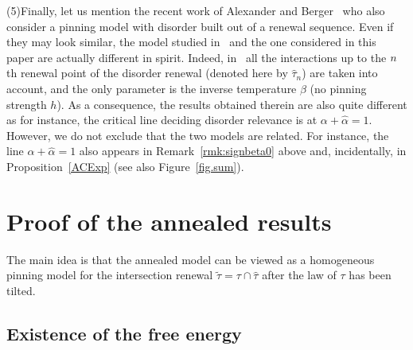 \documentclass[10pt]{amsart}
\theoremstyle{definition}\newtheorem{defi}[theo]{Definition}\newtheorem{rema}[theo]{Remark}\newtheorem{exam}[theo]{Example}\newtheorem{exem}[theo]{Example}\newtheorem{nota}[theo]{Notation}
\newcommand{\ga}{\alpha}
\newcommand{\gb}{\beta}
\renewcommand{\tilde}{\widetilde}
\newcommand{\htau}{\hat\tau}
\begin{document}
\noindent (5)\enskip Finally, let us mention the recent work of Alexander and Berger~\cite{A17_1} who also consider a pinning model with disorder built out of a renewal sequence. Even if they may look similar, the model studied in~\cite{A17_1} and the one considered in this paper are actually different in spirit. Indeed, in~\cite{A17_1} all the interactions up to the $n\mskip 1mu$th renewal point of the disorder renewal (denoted here by $\htau_n$) are taken into account, and the only parameter is the inverse temperature $\gb$ (no pinning strength $h$). As a consequence, the results obtained therein are also quite different as for instance, the critical line deciding disorder relevance is at $\ga + \hat \ga = 1$. However, we do not exclude that the two models are related. For instance, the line $\ga + \hat \ga = 1$ also appears in Remark~\ref{rmk:signbeta0} above and, incidentally, in Proposition~\ref{ACExp} (see also Figure~\ref{fig.sum}).

\section{Proof of the annealed results}\label{sec3}

The main idea is that the annealed model can be viewed as a homogeneous pinning model for the intersection renewal $\tilde\tau = \tau \cap \htau$ after the law of $\tau$ has been tilted.

\subsection{Existence of the free energy}\label{sec3.1}
\end{document}
